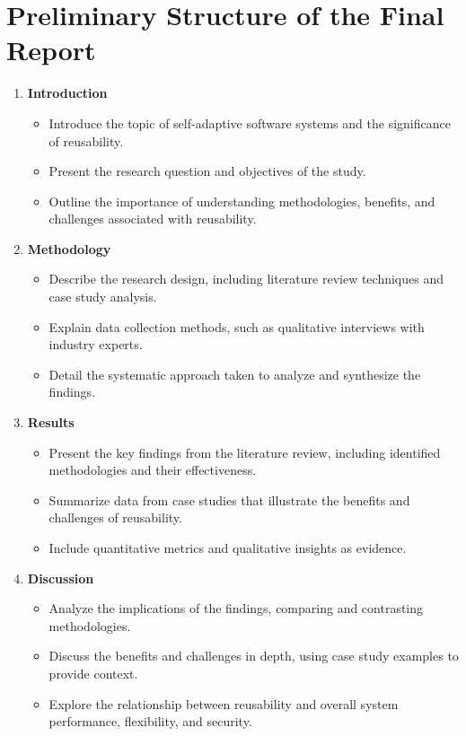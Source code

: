 \documentclass[a4paper, 12pt]{article}
\begin{document}
\section{Preliminary Structure of the Final Report}
\begin{enumerate}
    \item \textbf{Introduction}
    \begin{itemize}
        \item Introduce the topic of self-adaptive software systems and the significance of reusability.
        \item Present the research question and objectives of the study.
        \item Outline the importance of understanding methodologies, benefits, and challenges associated with reusability.
    \end{itemize}
    \item \textbf{Methodology}
    \begin{itemize}
        \item Describe the research design, including literature review techniques and case study analysis.
        \item Explain data collection methods, such as qualitative interviews with industry experts.
        \item Detail the systematic approach taken to analyze and synthesize the findings.
    \end{itemize}
    \item \textbf{Results}
    \begin{itemize}
        \item Present the key findings from the literature review, including identified methodologies and their effectiveness.
        \item Summarize data from case studies that illustrate the benefits and challenges of reusability.
        \item Include quantitative metrics and qualitative insights as evidence.
    \end{itemize}
    \item \textbf{Discussion}
    \begin{itemize}
        \item Analyze the implications of the findings, comparing and contrasting methodologies.
        \item Discuss the benefits and challenges in depth, using case study examples to provide context.
        \item Explore the relationship between reusability and overall system performance, flexibility, and security.

\end{itemize}
\end{enumerate}
\end{document}
